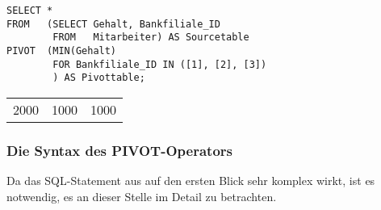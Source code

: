         \begin{lstlisting}[language=ms_sql,caption={Das Ergebnis als Pivottabelle},label=sql06_23]
SELECT *
FROM   (SELECT Gehalt, Bankfiliale_ID
        FROM   Mitarbeiter) AS Sourcetable
PIVOT  (MIN(Gehalt)
        FOR Bankfiliale_ID IN ([1], [2], [3])
        ) AS Pivottable;
        \end{lstlisting}
        \begin{center}
          \begin{small}
            \tablehead{}

            \begin{mssql}
              \begin{supertabular}{lll}
                2000 & 1000 & 1000 \\
              \end{supertabular}
            \end{mssql}
          \end{small}
        \end{center}
        \subsubsection{Die Syntax des PIVOT-Operators}
          Da das SQL-Statement aus  auf den ersten Blick sehr komplex wirkt, ist es notwendig, es an dieser Stelle im Detail zu betrachten.


